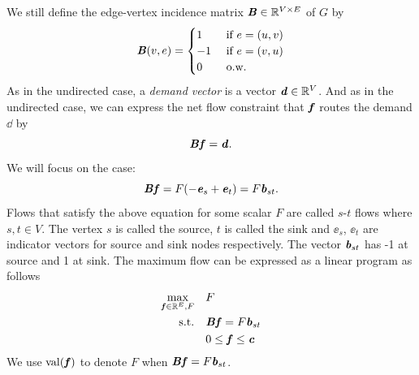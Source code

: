 We still define the edge-vertex incidence matrix $\boldsymbol{\mathit{B}} \in \mathbb{R}^{V \times E}$ of $G$ by
\[
  \boldsymbol{\mathit{B}}(v,e) =
  \begin{cases}
    1 & \text{ if } e = (u,v) \\
    -1 &\text{ if } e = (v,u) \\
    0 &\text{ o.w.}
  \end{cases}
\]
As in the undirected case, a \emph{demand vector} is a vector \(\boldsymbol{\mathit{d}} \in \mathbb{R}^{V} \).
And as in the undirected case, we can express the net flow constraint that
$\boldsymbol{\mathit{f}}$ routes the demand $\dd$ by
\[
  \boldsymbol{\mathit{B}} \boldsymbol{\mathit{f}} = \boldsymbol{\mathit{d}}
  .
\]
We will focus on the case:
  \begin{equation} \nonumber
      \boldsymbol{\mathit{B}}\boldsymbol{\mathit{f}}= F (-\boldsymbol{\mathit{e}}_{s}+\boldsymbol{\mathit{e}}_t) = F \boldsymbol{\mathit{b}}_{st}.
  \end{equation}
 Flows that satisfy the above equation for some scalar \(F\) are
 called $s$-$t$ flows where \(s, t \in V\).
 The vertex \(s\) is called the source, \(t\) is called the sink and  \(\ee_s\), \(\ee_t\) are indicator vectors for source and sink nodes respectively. The vector \(\boldsymbol{\mathit{b}}_{st}\) has -1 at source and 1 at sink. The maximum flow can be expressed as a linear program as follows
 \begin{equation}
   \label{eq:maxflow}
\begin{aligned}
\max_{\boldsymbol{\mathit{f}} \in \mathbb{R}^E,F} \quad & F\\
\textrm{s.t.} \quad & \boldsymbol{\mathit{B}}\boldsymbol{\mathit{f}}= F \boldsymbol{\mathit{b}}_{st}\\
  & 0 \leq \boldsymbol{\mathit{f}} \leq \boldsymbol{\mathit{c}}   \\
\end{aligned}
\end{equation}
We use $\operatorname*{val}(\boldsymbol{\mathit{f}})$ to denote $F$ when $\boldsymbol{\mathit{B}}\boldsymbol{\mathit{f}} = F\boldsymbol{\mathit{b}}_{st}$.


